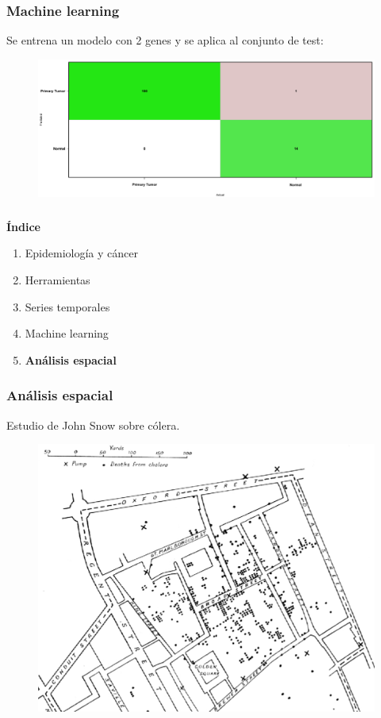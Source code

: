 \documentclass{beamer}
\begin{document}
\begin{frame}\frametitle{Machine learning}
	Se entrena un modelo con 2 genes y se aplica al conjunto de test:
	\begin{figure}
		\centering
		\includegraphics[width=.9\textwidth]{images/17_higado_biclase_18_svm_matriz_confusion_mejor_metodo.png}
	\end{figure}
\end{frame}

\begin{frame}\frametitle{}
	\Large{\textbf{Índice}}\\[2ex]
	\normalsize
	\begin{enumerate}
		\item Epidemiología y cáncer\\[2ex]
		\item Herramientas\\[2ex]
		\item Series temporales \\[2ex]
		\item Machine learning \\[2ex]
		\item \textbf{Análisis espacial} \\[2ex]
	\end{enumerate}
\end{frame}


\begin{frame}\frametitle{Análisis espacial}
	\centering Estudio de John Snow sobre cólera.
	\begin{figure}
		\centering
		\includegraphics[width=.75\textwidth]{images/mapa_3.png}
	\end{figure}
\end{frame}
\end{document}
